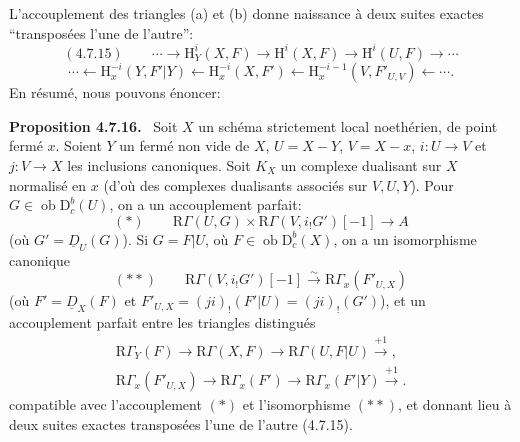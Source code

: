 \documentclass[11pt]{article}
\newenvironment{statement}[1]{\par\medskip\noindent\textbf{#1.}\ }{\par\medskip}
\renewcommand{\H}{\mathrm{H}}
\newcommand{\R}{\mathrm{R}}
\newcommand{\D}{\mathrm{D}}
\newcommand{\ob}{\operatorname{ob}}
\providecommand{\ob}{\operatorname{ob}}
\begin{document}
L'accouplement des triangles (a) et (b) donne naissance à deux suites exactes ``transposées l'une de l'autre'':
\[
(4.7.15)\qquad \cdots\longrightarrow \H_Y^i(X,F)\longrightarrow\H^i(X,F)\longrightarrow\H^i(U,F)\longrightarrow\cdots
\]
\[
\cdots\longleftarrow \H_x^{-i}(Y,F'|Y)\longleftarrow\H_x^{-i}(X,F')\longleftarrow\H_x^{-i-1}(V,F'_{U,V})\longleftarrow\cdots.
\]
En résumé, nous pouvons énoncer:

\begin{statement}{Proposition 4.7.16}
Soit $X$ un schéma strictement local noethérien, de point fermé $x$. Soient $Y$ un fermé non vide de $X$, $U=X-Y$, $V=X-x$, $i:U\to V$ et $j:V\to X$ les inclusions canoniques. Soit $K_X$ un complexe dualisant sur $X$ normalisé en $x$ (d'où des complexes dualisants associés sur $V,U,Y$). Pour $G\in\ob\D_c^b(U)$, on a un accouplement parfait:
\[
(*)\qquad \R\Gamma(U,G)\times\R\Gamma(V,i_!G')[-1]\longrightarrow A
\]
(où $G'=\underline{D}_U(G)$). Si $G=F|U$, où $F\in\ob\D_c^b(X)$, on a un isomorphisme canonique
\[
(**)\qquad \R\Gamma(V,i_!G')[-1]\xrightarrow{\sim}\R\Gamma_x(F'_{U,X})
\]
(où $F'=\underline{D}_X(F)$ et $F'_{U,X}=(ji)_!(F'|U)=(ji)_!(G')$), et un accouplement parfait entre les triangles distingués
\[
\begin{gathered}
\R\Gamma_Y(F)\longrightarrow \R\Gamma(X,F)\longrightarrow \R\Gamma(U,F|U)\xrightarrow{+1},\\
\R\Gamma_x(F'_{U,X})\longrightarrow \R\Gamma_x(F')\longrightarrow \R\Gamma_x(F'|Y)\xrightarrow{+1}.
\end{gathered}
\]
compatible avec l'accouplement $(*)$ et l'isomorphisme $(**)$, et donnant lieu à deux suites exactes transposées l'une de l'autre (4.7.15).
\end{statement}
\end{document}

